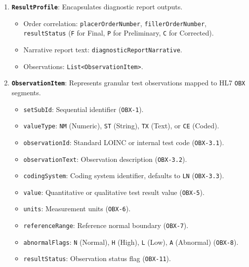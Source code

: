 \begin{enumerate}
\begin{itemize}
        \item Context: \texttt{orderType} (\texttt{PATHOLOGY}, \texttt{DIAGNOSTIC\_IMAGING}), \texttt{universalServiceId}, \texttt{universalServiceText}.
        \item Clinical attributes: \texttt{priority} (\texttt{R} for Routine, \texttt{S} for Stat), \texttt{orderDateTime}, \texttt{clinicalIndication}.
    \end{itemize}
    \item \textbf{\texttt{ResultProfile}}: Encapsulates diagnostic report outputs.
    \begin{itemize}
        \item Order correlation: \texttt{placerOrderNumber}, \texttt{fillerOrderNumber}, \texttt{resultStatus} (\texttt{F} for Final, \texttt{P} for Preliminary, \texttt{C} for Corrected).
        \item Narrative report text: \texttt{diagnosticReportNarrative}.
        \item Observations: \texttt{List<ObservationItem>}.
    \end{itemize}
    \item \textbf{\texttt{ObservationItem}}: Represents granular test observations mapped to HL7 \texttt{OBX} segments.
    \begin{itemize}
        \item \texttt{setSubId}: Sequential identifier (\texttt{OBX-1}).
        \item \texttt{valueType}: \texttt{NM} (Numeric), \texttt{ST} (String), \texttt{TX} (Text), or \texttt{CE} (Coded).
        \item \texttt{observationId}: Standard LOINC or internal test code (\texttt{OBX-3.1}).
        \item \texttt{observationText}: Observation description (\texttt{OBX-3.2}).
        \item \texttt{codingSystem}: Coding system identifier, defaults to \texttt{LN} (\texttt{OBX-3.3}).
        \item \texttt{value}: Quantitative or qualitative test result value (\texttt{OBX-5}).
        \item \texttt{units}: Measurement units (\texttt{OBX-6}).
        \item \texttt{referenceRange}: Reference normal boundary (\texttt{OBX-7}).
        \item \texttt{abnormalFlags}: \texttt{N} (Normal), \texttt{H} (High), \texttt{L} (Low), \texttt{A} (Abnormal) (\texttt{OBX-8}).
        \item \texttt{resultStatus}: Observation status flag (\texttt{OBX-11}).
    \end{itemize}
\end{enumerate}

